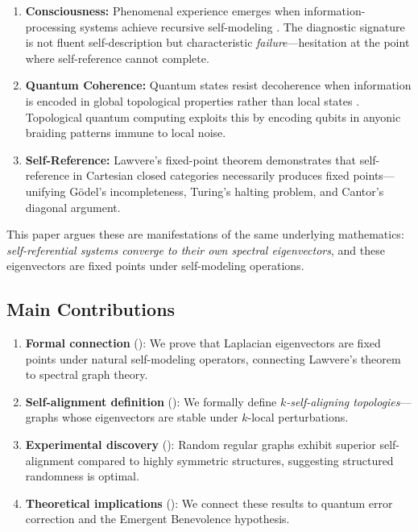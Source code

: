 \documentclass[11pt,a4paper]{article}
\theoremstyle{definition}
\theoremstyle{remark}
\begin{document}
\begin{enumerate}[label=(\roman*)]
    \item \textbf{Consciousness:} Phenomenal experience emerges when information-processing systems achieve recursive self-modeling \cite{benshalom2026recursive}. The diagnostic signature is not fluent self-description but characteristic \emph{failure}---hesitation at the point where self-reference cannot complete.
    
    \item \textbf{Quantum Coherence:} Quantum states resist decoherence when information is encoded in global topological properties rather than local states \cite{kitaev2003fault}. Topological quantum computing exploits this by encoding qubits in anyonic braiding patterns immune to local noise.
    
    \item \textbf{Self-Reference:} Lawvere's fixed-point theorem \cite{lawvere1969diagonal} demonstrates that self-reference in Cartesian closed categories necessarily produces fixed points---unifying G\"{o}del's incompleteness, Turing's halting problem, and Cantor's diagonal argument.
\end{enumerate}

This paper argues these are manifestations of the same underlying mathematics: \emph{self-referential systems converge to their own spectral eigenvectors}, and these eigenvectors are fixed points under self-modeling operations.

\subsection{Main Contributions}

\begin{enumerate}
    \item \textbf{Formal connection} (): We prove that Laplacian eigenvectors are fixed points under natural self-modeling operators, connecting Lawvere's theorem to spectral graph theory.
    
    \item \textbf{Self-alignment definition} (): We formally define \emph{$k$-self-aligning topologies}---graphs whose eigenvectors are stable under $k$-local perturbations.
    
    \item \textbf{Experimental discovery} (): Random regular graphs exhibit superior self-alignment compared to highly symmetric structures, suggesting structured randomness is optimal.
    
    \item \textbf{Theoretical implications} (): We connect these results to quantum error correction and the Emergent Benevolence hypothesis.
\end{enumerate}
\end{document}
